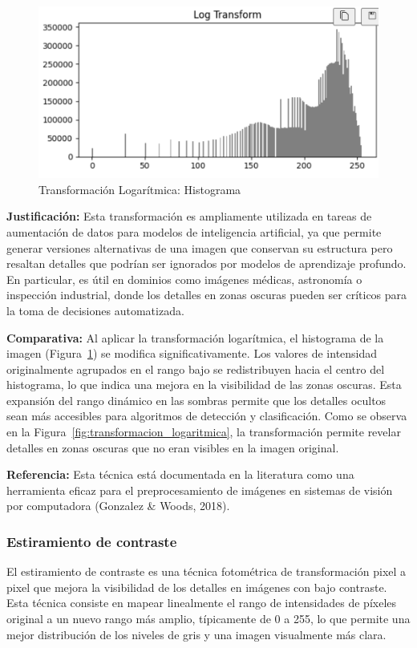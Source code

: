 \documentclass[12pt,letterpaper]{article}
\begin{document}
\begin{figure}[H]
  \centering
  \includegraphics[width=0.5\linewidth]{figuras/histograma_transformacion_logaritmica.png}
  \caption{Transformación Logarítmica: Histograma}
  \label{fig:histograma_transformacion_logaritmica}
\end{figure}

\textbf{Justificación:} Esta transformación es ampliamente utilizada en tareas de aumentación de datos para modelos de inteligencia artificial, ya que permite generar versiones alternativas de una imagen que conservan su estructura pero resaltan detalles que podrían ser ignorados por modelos de aprendizaje profundo. En particular, es útil en dominios como imágenes médicas, astronomía o inspección industrial, donde los detalles en zonas oscuras pueden ser críticos para la toma de decisiones automatizada.

\textbf{Comparativa:} Al aplicar la transformación logarítmica, el histograma de la imagen (Figura~\ref{fig:histograma_transformacion_logaritmica}) se modifica significativamente. Los valores de intensidad originalmente agrupados en el rango bajo se redistribuyen hacia el centro del histograma, lo que indica una mejora en la visibilidad de las zonas oscuras. Esta expansión del rango dinámico en las sombras permite que los detalles ocultos sean más accesibles para algoritmos de detección y clasificación. Como se observa en la Figura~\ref{fig:transformacion_logaritmica}, la transformación permite revelar detalles en zonas oscuras que no eran visibles en la imagen original.

\textbf{Referencia:} Esta técnica está documentada en la literatura como una herramienta eficaz para el preprocesamiento de imágenes en sistemas de visión por computadora (Gonzalez & Woods, 2018).

\subsubsection{Estiramiento de contraste}
El estiramiento de contraste es una técnica fotométrica de transformación pixel a pixel que mejora la visibilidad de los detalles en imágenes con bajo contraste. Esta técnica consiste en mapear linealmente el rango de intensidades de píxeles original a un nuevo rango más amplio, típicamente de 0 a 255, lo que permite una mejor distribución de los niveles de gris y una imagen visualmente más clara.
\end{document}
